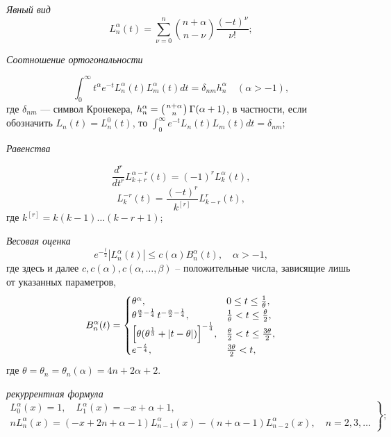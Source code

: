 \textit{Явный вид}
\begin{equation}\label{lag-2.2}
L_n^\alpha(t) =
\sum\limits_{\nu=0}^{n}
\binom{n+\alpha}{n-\nu}
\frac{(-t)^\nu}{\nu!};
\end{equation}

\textit{Соотношение ортогональности}

\begin{equation}
\label{lag-2.3}
\int_0^{\infty} t^{\alpha} e^{-t} L^{\alpha}_{n}(t) L^{\alpha}_{m}(t) dt = \delta_{nm} h^{\alpha}_n \quad (\alpha > -1),
\end{equation}
где $\delta_{nm}$ --- символ Кронекера,
$h^{\alpha}_n = \left( n+\alpha \atop n \right) \Gamma(\alpha +1)$,
в частности, если обозначить $L_{n}(t) = L^{0}_{n}(t)$, то $\int_0^{\infty} e^{-t} L_{n}(t) L_{m}(t) dt = \delta_{nm}$;

\textit{ Равенства}

\begin{equation} \label{lag-2.6}
\frac{d^r}{dt^r} L_{k+r}^{\alpha-r}(t) = (-1)^{r} L_{k}^{\alpha}(t),
\end{equation}
\begin{equation}\label{lag-2.7}
L_{k}^{-r}(t) = \frac{(-t)^{r}}{k^{[r]}} L_{k-r}^{r}(t),
\end{equation}
где $k^{[r]} = k(k-1)\ldots(k-r+1)$;


\textit{Весовая оценка} \cite{AskeyWaiger}
\begin{equation}\label{lag-2.10}
e^{-\frac{t}{2}}|L_n^\alpha(t)| \le c(\alpha) B_n^\alpha(t), \quad \alpha>-1,
\end{equation}
где здесь и далее $c,c(\alpha),c(\alpha,\ldots,\beta)$ -- положительные числа, зависящие лишь от указанных параметров,
\begin{equation}\label{lag-2.11}
B_n^\alpha(t)=
\begin{cases}
\theta^\alpha, &0 \le t \le \frac{1}{\theta},\\
\theta^{\frac{\alpha}{2} - \frac{1}{4}}\,t^{-\frac{\alpha}{2} - \frac{1}{4}}, & \frac{1}{\theta} < t \le \frac{\theta}{2},\\
\Bigl[
\theta(\theta^{\frac{1}{3}}+|t-\theta|)
\Bigr]^{-\frac{1}{4}}, & \frac{\theta}{2} < t \le \frac{3\theta}{2},\\
e^{-\frac{t}{4}}, &\frac{3\theta}{2}< t,
\end{cases}
\end{equation}
где $\theta=\theta_n=\theta_n(\alpha)=4n+2\alpha+2$.

\textit{рекуррентная формула}
\begin{equation}\label{Ram_eq4}
\left.\begin{gathered}
L_{0}^{\alpha}(x)=1, \quad L_1^{\alpha}(x)=-x+\alpha+1,\\
nL_n^{\alpha}(x)=(-x+2n+\alpha-1)L_{n-1}^{\alpha}(x)-(n+\alpha-1)L_{n-2}^{\alpha}(x), \quad n=2, 3, \ldots
\end{gathered}\right\};
\end{equation}


